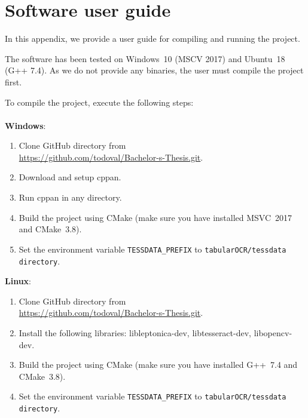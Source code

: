\chapter{Software user guide}

In this appendix, we provide a user guide for compiling and running the project.

The software has been tested on Windows~10 (MSCV 2017) and Ubuntu~18 (G++ 7.4). As we do not provide any binaries, the user must compile the project first.

To compile the project, execute the following steps:\\
\\
\textbf{Windows}:
\begin{enumerate}
    \item Clone GitHub directory from\\
    \url{https://github.com/todoval/Bachelor-s-Thesis.git}.
    \item Download and setup cppan.
    \item Run cppan in any directory.
    \item Build the project using CMake (make sure you have installed MSVC~2017 and CMake~3.8).
    \item Set the environment variable \texttt{TESSDATA\_PREFIX} to \texttt{tabularOCR/tessdata directory}.
\end{enumerate}

\textbf{Linux}:
\begin{enumerate}
    \item Clone GitHub directory from\\
    \url{https://github.com/todoval/Bachelor-s-Thesis.git}.
    \item Install the following libraries: libleptonica-dev, libtesseract-dev, libopencv-dev.
    \item Build the project using CMake (make sure you have installed G++~7.4 and CMake~3.8).
    \item Set the environment variable \texttt{TESSDATA\_PREFIX} to \texttt{tabularOCR/tessdata directory}.
\end{enumerate}

